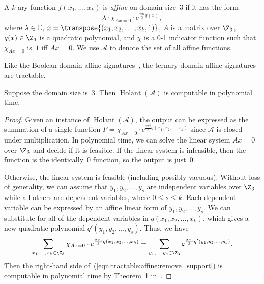 \documentclass[11pt]{article}
\newcommand{\Holant}{\operatorname{Holant}}
\begin{document}
\begin{definition}
 A $k$-ary function $f(x_1, \dotsc, x_k)$ is \emph{affine} on domain size~$3$ if it has the form
 \[
  \lambda \cdot \chi_{A x = 0} \cdot e^{\frac{2 \pi i}{3} q(x)},
 \]
 where $\lambda \in \mathbb{C}$,
 $x = \transpose{(x_1, x_2, \dotsc, x_k, 1)}$,
 $A$ is a matrix over $\Z_3$,
 $q(x) \in \Z_3$ is a quadratic polynomial,
 and $\chi$ is a 0-1 indicator function such that $\chi_{A x = 0}$ is~$1$ iff $A x = 0$.
 We use $\mathscr{A}$ to denote the set of all affine functions.
\end{definition}

Like the Boolean domain affine signatures~\cite{CCLL10},
the ternary domain affine signatures are tractable.

\begin{lemma} \label{lem:tractable:k=3_affine}
 Suppose the domain size is~$3$.
 Then $\Holant(\mathscr{A})$ is computable in polynomial time.
\end{lemma}

\begin{proof}
 Given an instance of $\Holant(\mathscr{A})$,
 the output can be expressed as the summation of a single function $F = \chi_{Ax = 0} \cdot e^{\frac{2 \pi i}{3} q(x_1, x_2, \dotsc, x_k)}$
 since $\mathscr{A}$ is closed under multiplication.
 In polynomial time,
 we can solve the linear system $A x = 0$ over $\Z_3$ and decide if it is feasible.
 If the linear system is infeasible,
 then the function is the identically~$0$ function,
 so the output is just~$0$.
 
 Otherwise, the linear system is feasible (including possibly vacuous).
 Without loss of generality,
 we can assume that $y_1, y_2, \dotsc, y_s$ are independent variables over $\Z_3$ while all others are dependent variables,
 where $0 \le s \le k$.
 Each dependent variable can be expressed by an affine linear form of $y_1, y_2, \dotsc, y_s$.
 We can substitute for all of the dependent variables in $q(x_1, x_2, \dotsc, x_k)$,
 which gives a new quadratic polynomial $q'(y_1, y_2, \dotsc, y_s)$.
 Thus, we have
 \begin{equation} \label{eqn:tractable:affine:remove_support}
  \sum_{x_1, \dotsc, x_k \in \Z_3} \chi_{Ax = 0} \cdot e^{\frac{2 \pi i}{3} q (x_1, x_2, \dotsc, x_k)}
  =
  \sum_{y_1, \dotsc, y_s \in \Z_3}                     e^{\frac{2 \pi i}{3} q'(y_1, y_2, \dotsc, y_s)}.
 \end{equation}
 Then the right-hand side of~(\ref{eqn:tractable:affine:remove_support}) is computable in polynomial time by Theorem~1 in~\cite{CLX14}.
\end{proof}
\end{document}
